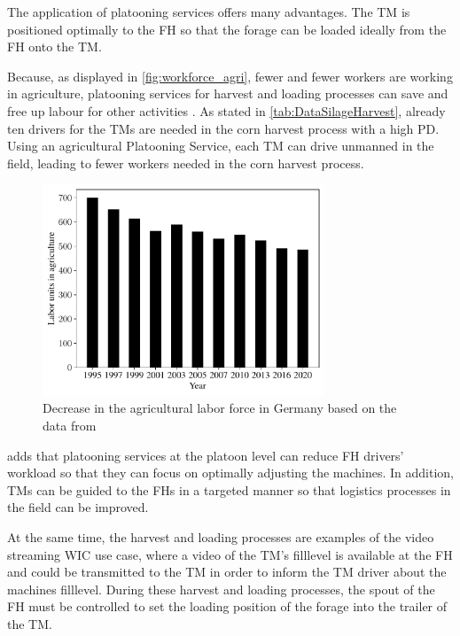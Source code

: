 The application of platooning services offers many advantages.
The \ac{TM} is positioned optimally to the \ac{FH} so that the forage can be loaded ideally from the \ac{FH} onto the \ac{TM}.

Because, as displayed in \autoref{fig:workforce_agri}, fewer and fewer workers are working in agriculture, platooning services for harvest and loading processes can save and free up labour for other activities \cite{liu_automation_2022}. As stated in \autoref{tab:DataSilageHarvest}, already ten drivers for the \ac{TM}s are needed in the corn harvest process with a high \ac{PD}. Using an agricultural Platooning Service, each \ac{TM} can drive unmanned in the field, leading to fewer workers needed in the corn harvest process.

\begin{figure}[H]
	\centering
	\includegraphics[width=0.75\textwidth]{figures/WorkForceAgriculture.pdf}
	\caption{Decrease in the agricultural labor force in Germany based on the data from \cite{bmel2020}}%
	\label{fig:workforce_agri}%
\end{figure}

\textcite{smolnik_5g_2020} adds that platooning services at the platoon level can reduce \ac{FH} drivers' workload so that they can focus on optimally adjusting the machines.
In addition, \ac{TM}s can be guided to the \ac{FH}s in a targeted manner so that logistics processes in the field can be improved.

At the same time, the harvest and loading processes are examples of the video streaming \ac{WIC} use case, where a video of the \ac{TM}'s filllevel is available at the \ac{FH} and could be transmitted to the \ac{TM} in order to inform the \ac{TM} driver about the machines filllevel. During these harvest and loading processes, the spout of the \ac{FH} must be controlled to set the loading position of the forage into the trailer of the \ac{TM}.

